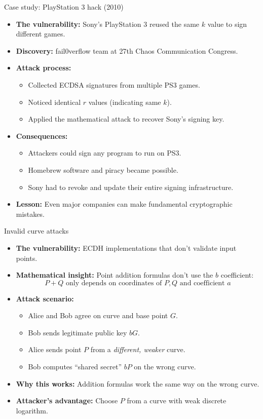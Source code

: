 \documentclass[aspectratio=169, lualatex, handout]{beamer}
\begin{document}
\begin{frame}{Case study: PlayStation 3 hack (2010)}
	\begin{itemize}
		\item \textbf{The vulnerability:} Sony's PlayStation 3 reused the same $k$ value to sign different games.
		\item \textbf{Discovery:} fail0verflow team at 27th Chaos Communication Congress.
		\item \textbf{Attack process:}
		      \begin{itemize}
			      \item Collected ECDSA signatures from multiple PS3 games.
			      \item Noticed identical $r$ values (indicating same $k$).
			      \item Applied the mathematical attack to recover Sony's signing key.
		      \end{itemize}
		\item \textbf{Consequences:}
		      \begin{itemize}
			      \item Attackers could sign any program to run on PS3.
			      \item Homebrew software and piracy became possible.
			      \item Sony had to revoke and update their entire signing infrastructure.
		      \end{itemize}
		\item \textbf{Lesson:} Even major companies can make fundamental cryptographic mistakes.
	\end{itemize}
\end{frame}

\begin{frame}{Invalid curve attacks}
	\begin{itemize}
		\item \textbf{The vulnerability:} ECDH implementations that don't validate input points.
		\item \textbf{Mathematical insight:} Point addition formulas don't use the $b$ coefficient:
		      $$P + Q \text{ only depends on coordinates of } P, Q \text{ and coefficient } a$$
		\item \textbf{Attack scenario:}
		      \begin{itemize}
			      \item Alice and Bob agree on curve and base point $G$.
			      \item Bob sends legitimate public key $bG$.
			      \item Alice sends point $P$ from a \emph{different, weaker} curve.
			      \item Bob computes ``shared secret'' $bP$ on the wrong curve.
		      \end{itemize}
		\item \textbf{Why this works:} Addition formulas work the same way on the wrong curve.
		\item \textbf{Attacker's advantage:} Choose $P$ from a curve with weak discrete logarithm.
	\end{itemize}
\end{frame}
\end{document}
